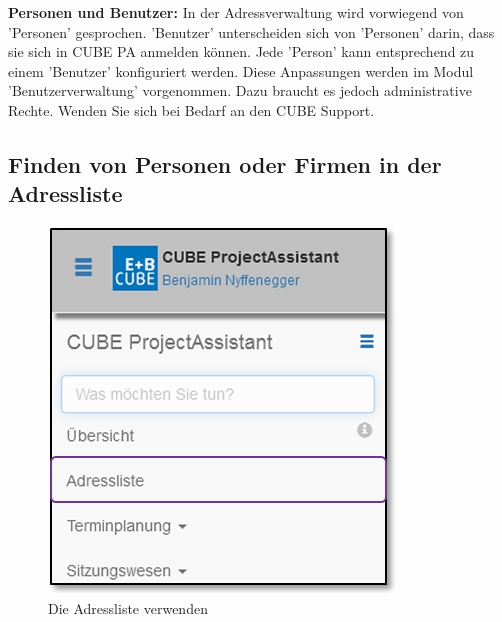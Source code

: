 \textbf{Personen und Benutzer:} In der Adressverwaltung wird vorwiegend von 'Personen' gesprochen. 'Benutzer' unterscheiden sich von 'Personen' darin, dass sie sich in CUBE PA anmelden können. Jede 'Person' kann entsprechend zu einem 'Benutzer' konfiguriert werden. Diese Anpassungen werden im Modul 'Benutzerverwaltung' vorgenommen. Dazu braucht es jedoch administrative Rechte. Wenden Sie sich bei Bedarf an den CUBE Support.

\pagebreak
\subsection{Finden von Personen oder Firmen in der Adressliste}

\begin{figure}   %
  \vspace{-35pt}      %
  \begin{center}
    \includegraphics[width=1\linewidth]{../chapters/03_Adressliste/pictures/3-1_Menu_Adressliste.jpg}
  \end{center}
  \vspace{-20pt}
  \caption{Die Adressliste verwenden}
  \vspace{-10pt}
\end{figure}


